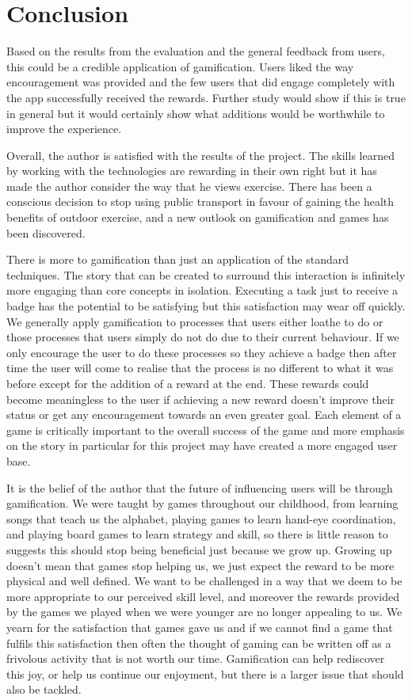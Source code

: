 \chapter{Conclusion}\label{ch_conclusion}
Based on the results from the evaluation and the general feedback from
users, this could be a credible application of gamification. Users
liked the way encouragement was provided and the few users that did
engage completely with the app successfully received the
rewards. Further study would show if this is true in general but it
would certainly show what additions would be worthwhile to improve the
experience. 

Overall, the author is satisfied with the results of the project. The
skills learned by working with the technologies are rewarding in their
own right but it has made the author consider the way that he views
exercise. There has been a conscious decision to stop using public
transport in favour of gaining the health benefits of outdoor
exercise, and a new outlook on gamification and games has been
discovered. 

There is more to gamification than just an application of the
standard techniques. The story that can be created to
surround this interaction is infinitely more engaging than core
concepts in isolation. Executing a task just to receive a badge has
the potential to be satisfying but this satisfaction may wear off
quickly. We generally apply gamification to processes that users
either loathe to do or those processes that users simply do not do due
to their current behaviour. If we only encourage the user to do these
processes so they achieve a badge then after time the user will come
to realise that the process is no different to what it was before
except for the addition of a reward at the end. These rewards could
become meaningless to the user if achieving a new reward doesn't
improve their status or get any encouragement towards an even greater
goal. Each element of a game is critically important to the overall
success of the game and more emphasis on the story in particular for
this project may have created a more engaged user base.

It is the belief of the author that the future of influencing users
will be through gamification. We were taught by games throughout our
childhood, from learning songs that teach us the alphabet, playing
games to learn hand-eye coordination, and playing board games to learn
strategy and skill, so there is little reason to suggests this
should stop being beneficial just because we grow up. Growing up
doesn't mean that games stop helping us, we just expect the reward to
be more physical and well defined. We want to be challenged in a way
that we deem to be more appropriate to our perceived skill level, and
moreover the rewards provided by the games we played when we were
younger are no longer appealing to us. We yearn for the satisfaction
that games gave us and if we cannot find a game that fulfils this
satisfaction then often the thought of gaming can be written off as a
frivolous activity that is not worth our time. Gamification can help
rediscover this joy, or help us continue our enjoyment, but there is a
larger issue that should also be tackled.

